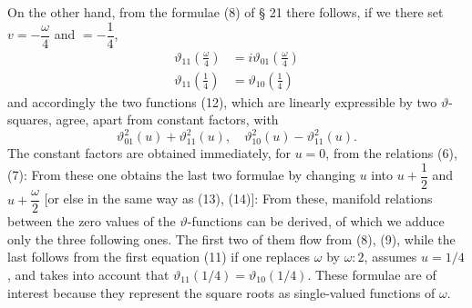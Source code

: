 On the other hand, from the formulae (8) of § 21 there follows, if we there set $v = -\dfrac{\omega}{4}$ and $= -\dfrac{1}{4}$,
\[
\begin{aligned}
\vartheta_{11}\left(\frac{\omega}{4}\right) &= i\vartheta_{01}\left(\frac{\omega}{4}\right) \\
\vartheta_{11}\left(\frac{1}{4}\right) &= \vartheta_{10}\left(\frac{1}{4}\right)
\end{aligned}
\]
and accordingly the two functions (12), which are linearly expressible by two $\vartheta$-squares, agree, apart from constant factors, with
\[
\vartheta_{01}^2(u) + \vartheta_{11}^2(u), \quad \vartheta_{10}^2(u) - \vartheta_{11}^2(u).
\]
The constant factors are obtained immediately, for $u = 0$, from the relations (6), (7):
From these one obtains the last two formulae by changing $u$ into $u + \dfrac{1}{2}$ and $u + \dfrac{\omega}{2}$ [or else in the same way as (13), (14)]:
From these, manifold relations between the zero values of the $\vartheta$-functions can be derived, of which we adduce only the three following ones. The first two of them flow from (8), (9), while the last follows from the first equation (11) if one replaces $\omega$ by $\omega{:}2$, assumes $u = 1/4$, and takes into account that $\vartheta_{11}(1/4) = \vartheta_{10}(1/4)$.
These formulae are of interest because they represent the square roots as single-valued functions of $\omega$.
